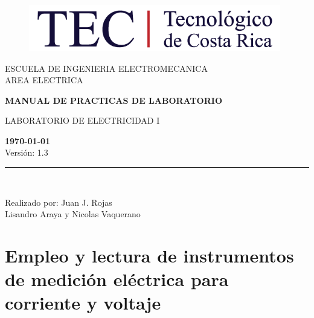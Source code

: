 \documentclass[12pt,letterpaper]{report}
\begin{document}
\begin{titlepage}

\begin{center}
\vspace*{1in}
\begin{figure}[htb]
\begin{center}
\includegraphics[width=11cm]{logo}
\end{center}
\end{figure}
\vspace*{0.4in}
\begin{Large}
ESCUELA DE INGENIERIA ELECTROMECANICA\\
\vspace*{0.15in}
AREA ELECTRICA\\
\vspace*{0.8in}
\end{Large}
\vspace*{0.2in}
\begin{Large}
\textbf{MANUAL DE PRACTICAS DE LABORATORIO} \\
\end{Large}
\vspace*{0.3in}
\begin{large}
LABORATORIO DE ELECTRICIDAD I\\
\end{large}
\vspace*{2.5in}
\begin{Large}
\textbf{\today}\\
Versión: 1.3\\
\end{Large}
\rule{80mm}{0.1mm}\\
\vspace*{0.1in}
\begin{large}
Realizado por: Juan J. Rojas \\
Lisandro Araya y Nicolas Vaquerano\\
\end{large}
\end{center}

\end{titlepage}

\tableofcontents

\chapter{Empleo y lectura de instrumentos de medición eléctrica para corriente y voltaje}
\end{document}
